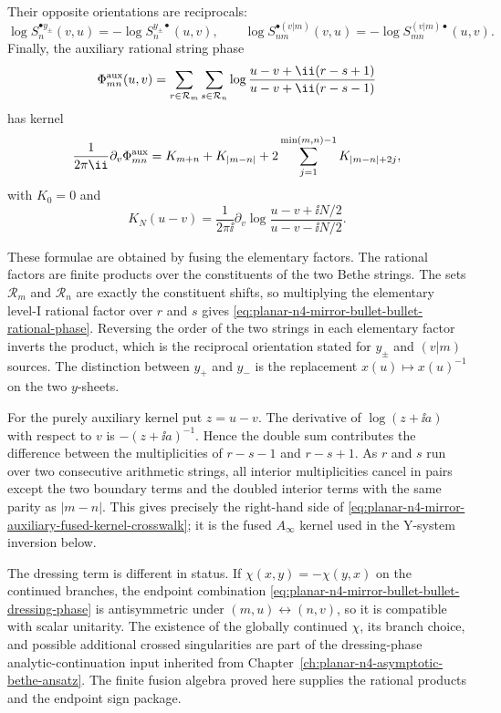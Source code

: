 Their opposite orientations are reciprocals:
\[
  \log S^{\bullet y_\pm}_n(v,u)=-\log S^{y_\pm\bullet}_n(u,v),
  \qquad
  \log S^{\bullet(v|m)}_{nm}(v,u)
  =
  -\log S^{(v|m)\bullet}_{mn}(u,v).
\]
Finally, the auxiliary rational string phase
\[
  \Phi^{\rm aux}_{mn}(u,v)
  =
  \sum_{r\in\mathcal R_m}\sum_{s\in\mathcal R_n}
  \log\frac{u-v+\ii(r-s+1)}{u-v+\ii(r-s-1)}
\]
has kernel
\begin{equation}
  \frac{1}{2\pi\ii}\partial_v\Phi^{\rm aux}_{mn}
  =
  K_{m+n}+K_{\lvert m-n\rvert}
  +
  2\sum_{j=1}^{\min(m,n)-1}K_{\lvert m-n\rvert+2j},
  \label{eq:planar-n4-mirror-auxiliary-fused-kernel-crosswalk}
\end{equation}
with \(K_0=0\) and
\[
  K_N(u-v)
  =
  \frac{1}{2\pi\ii}\partial_v
  \log\frac{u-v+\ii N/2}{u-v-\ii N/2}.
\]

These formulae are obtained by fusing the elementary factors.
The rational factors are finite products over the constituents of the two
Bethe strings.  The sets \(\mathcal R_m\) and \(\mathcal R_n\) are exactly the
constituent shifts, so multiplying the elementary level-I rational factor
over \(r\) and \(s\) gives
\eqref{eq:planar-n4-mirror-bullet-bullet-rational-phase}.  Reversing the
order of the two strings in each elementary factor inverts the product, which
is the reciprocal orientation stated for \(y_\pm\) and \((v|m)\) sources.
The distinction between \(y_+\) and \(y_-\) is the replacement
\(x(u)\mapsto x(u)^{-1}\) on the two \(y\)-sheets.

For the purely auxiliary kernel put \(z=u-v\).  The derivative of
\(\log(z+\ii a)\) with respect to \(v\) is \(-(z+\ii a)^{-1}\).  Hence the
double sum contributes the difference between the multiplicities of
\(r-s-1\) and \(r-s+1\).  As \(r\) and \(s\) run over two consecutive
arithmetic strings, all interior multiplicities cancel in pairs except the
two boundary terms and the doubled interior terms with the same parity as
\(|m-n|\).  This gives precisely the right-hand side of
\eqref{eq:planar-n4-mirror-auxiliary-fused-kernel-crosswalk}; it is the fused
\(A_\infty\) kernel used in the Y-system inversion below.

The dressing term is different in status.  If \(\chi(x,y)=-\chi(y,x)\) on the
continued branches, the endpoint combination
\eqref{eq:planar-n4-mirror-bullet-bullet-dressing-phase} is antisymmetric
under \((m,u)\leftrightarrow(n,v)\), so it is compatible with scalar
unitarity.  The existence of the globally continued \(\chi\), its branch
choice, and possible additional crossed singularities are part of the
dressing-phase analytic-continuation input inherited from
Chapter~\ref{ch:planar-n4-asymptotic-bethe-ansatz}.  The finite fusion algebra
proved here supplies the rational products and the endpoint sign package.

